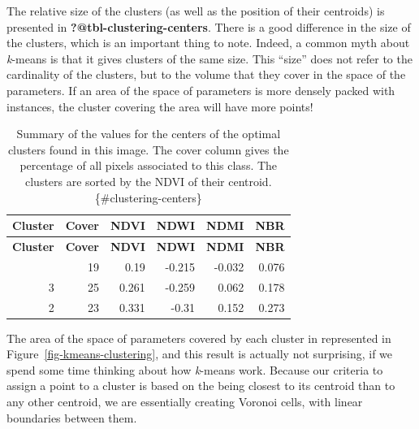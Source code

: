 \documentclass[
  letterpaper,
]{scrbook}
\begin{document}

The relative size of the clusters (as well as the position of their
centroids) is presented in \textbf{?@tbl-clustering-centers}. There is a
good difference in the size of the clusters, which is an important thing
to note. Indeed, a common myth about \emph{k}-means is that it gives
clusters of the same size. This ``size'' does not refer to the
cardinality of the clusters, but to the volume that they cover in the
space of the parameters. If an area of the space of parameters is more
densely packed with instances, the cluster covering the area will have
more points!

\begin{longtable}[]{@{}rrrrrr@{}}
\caption{Summary of the values for the centers of the optimal clusters
found in this image. The cover column gives the percentage of all pixels
associated to this class. The clusters are sorted by the NDVI of their
centroid. \{\#clustering-centers\}}\tabularnewline
\toprule\noalign{}
\textbf{Cluster} & \textbf{Cover} & \textbf{NDVI} & \textbf{NDWI} &
\textbf{NDMI} & \textbf{NBR} \\
\midrule\noalign{}
\endfirsthead
\toprule\noalign{}
\textbf{Cluster} & \textbf{Cover} & \textbf{NDVI} & \textbf{NDWI} &
\textbf{NDMI} & \textbf{NBR} \\
\midrule\noalign{}
\endhead
\bottomrule\noalign{}
\endlastfoot
1 & 19 & 0.19 & -0.215 & -0.032 & 0.076 \\
3 & 25 & 0.261 & -0.259 & 0.062 & 0.178 \\
2 & 23 & 0.331 & -0.31 & 0.152 & 0.273 \\
\end{longtable}

The area of the space of parameters covered by each cluster in
represented in Figure~\ref{fig-kmeans-clustering}, and this result is
actually not surprising, if we spend some time thinking about how
\emph{k}-means work. Because our criteria to assign a point to a cluster
is based on the being closest to its centroid than to any other
centroid, we are essentially creating Voronoi cells, with linear
boundaries between them.

\end{document}
